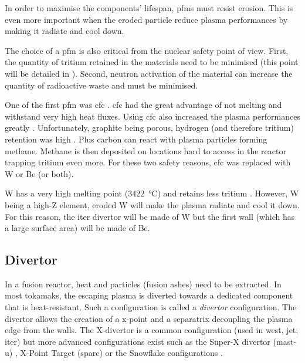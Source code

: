 In order to maximise the components' lifespan, \glspl{pfm} must resist erosion.
This is even more important when the eroded particle reduce \gls{plasma} performances by making it radiate and cool down.

The choice of a \gls{pfm} is also critical from the nuclear safety point of view.
First, the quantity of tritium retained in the materials need to be minimised (this point will be detailed in ).
Second, neutron activation of the material can increase the quantity of radioactive waste and must be minimised.

One of the first \gls{pfm} was \gls{cfc} .
\gls{cfc} had the great advantage of not melting and withstand very high heat fluxes.
Using \gls{cfc} also increased the \gls{plasma} performances greatly .
Unfortunately, graphite being porous, hydrogen (and therefore tritium) retention was high .
Plus carbon can react with \gls{plasma} particles forming methane.
Methane is then deposited on locations hard to access in the reactor \gls{trapping} tritium even more.
For these two safety reasons, \gls{cfc} was replaced with \Gls{W} or \gls{Be} (or both).

\Gls{W} has a very high melting point (\SI{3422}{\celsius}) and retains less tritium .
However, \Gls{W} being a high-Z element, eroded \Gls{W} will make the \gls{plasma} radiate and cool it down.
For this reason, the \acrshort{iter} divertor will be made of \Gls{W} but the first wall (which has a large surface area) will be made of \gls{Be}.

\subsection{Divertor}

In a fusion reactor, heat and particles (fusion ashes) need to be extracted.
In most \glspl{tokamak}, the escaping \gls{plasma} is diverted towards a dedicated component that is heat-resistant.
Such a configuration is called a \emph{\gls{divertor}} configuration.
The \gls{divertor} allows the creation of a \gls{x-point} and a \gls{separatrix} decoupling the \gls{plasma} edge from the walls. 
The X-divertor is a common configuration (used in \acrshort{west}, \acrshort{jet}, \acrshort{iter}) but more advanced configurations exist such as the Super-X \gls{divertor} (\acrshort{mast-u}) , X-Point Target (\acrshort{sparc})  or the Snowflake configurations .

